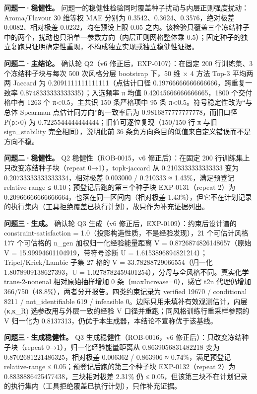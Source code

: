 \documentclass[11pt,a4paper]{article}
\begin{document}
\textbf{问题一·稳健性。}
问题一的稳健性检验同时覆盖种子扰动与内层正则强度扰动：Aroma/Flavour 30
维等权 MAE 分别为 0.3542、0.3624、0.3576，绝对极差 0.0082、相对极差
0.0232，均在预设上限 0.05
之内。该检验只覆盖三个冻结种子中的两个，扰动也只沿单一参数方向（内层正则网格整体乘
0.5）；固定种子的独立复跑只证明确定性重现，不构成独立实现或独立稳健性证据。

\textbf{问题二·主结论。} 确认轮 Q2（v6 修正后，EXP-0107）：在固定 200
行训练集、3 个冻结种子块与每次 500 次风格分层 bootstrap 下，50 维 × 4
方法 Top-3 平均两两 Jaccard 为 0.2091111111111111（点估计口径
0.19766666666666666，跨重复一致率 0.8748333333333335）；入选频率 π 均值
0.42045666666666665，1800 个交付格中有 1263 个 π\textless0.5，主共识 150
条严格项中 95 条 π\textless0.5。符号稳定性改为``与总体 Spearman
点估计同方向''的一致率后为 0.9816877777777778，而旧口径
P(ρ\textgreater0) 为 0.7225544444444444；旧值可逐位复现（150/150 行 π
与旧 sign\_stability 完全相同），说明此前 36
条负方向条目的低值来自定义错误而不是方向不稳。

\textbf{问题二·稳健性。} Q2 稳健性（ROB-0015，v6 修正后）：在固定 200
行训练集上只改变冻结种子块（repeat 0→1），topk-jaccard 从
0.2103333333333333 变为 0.20733333333333334，相对极差 0.003000 /
0.210333 ≈ 1.43\%，满足预登记 relative-range ≤
0.10；预登记后跑的第三个种子块 EXP-0131（repeat 2）为
0.20966666666666664，也落在同一区间内（相对极差
1.43\%），但它不在计划记录的执行集内（工具拒绝覆盖已执行计划），故只作为补充证据列出。

\textbf{问题三·生成。} 确认轮 Q3 生成（v6
修正后，EXP-0109）：约束后设计谱的 constraint-satisfaction =
1.0（投影构造性质，不是经验发现），21 个可估计风格 177 个可估格的 n\_gen
加权归一化经验能量距离 V = 0.8726874826148657（原始 V =
15.99994601104919，带符号诊断 U =
1.6153896894821214）；Tripel/Kriek/Lambic 子集 27 格的 V =
33.78288729066554（归一化 1.8078909138627393，U =
1.0278782459401254），分母与全风格不同。真实化学 trans-2-nonenal
相对原始抽样增加 0 条（maxIncrease=0），感官 t2n 代理仍增加
366/750（48.8\%），两者分开报告。四类约束记录为 verified 19670 /
conditional 8211 / not\_identifiable 619 / infeasible
0。边际只用未填补有效观测估计，内层 (κ,κ\_R) 选参改用与外层一致的经验 V
口径并重跑；同风格训练行重采样参照的 V 归一化为
0.8137313，仍优于本生成器，本结论不宣称优于该基线。

\textbf{问题三·生成稳健性。} Q3 生成稳健性（ROB-0016，v6
修正后）：只改变冻结种子块（repeat 0→1），归一化经验能量距离从
0.8639056831482218 变为 0.8702681221486325，相对极差 0.006362 / 0.863906
≈ 0.74\%，满足预登记 relative-range ≤ 0.05；预登记后跑的第三个种子块
EXP-0132（repeat 2）为 0.8838886425477438，三块相对极差 2.31\% 仍 ≤
0.05，但该第三块不在计划记录的执行集内（工具拒绝覆盖已执行计划），只作补充证据。
\end{document}
